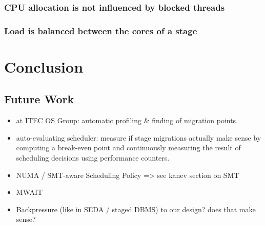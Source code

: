 \documentclass[12pt,a4paper]{book}
\begin{document}
\subsection{CPU allocation is not influenced by blocked threads}
\subsection{Load is balanced between the cores of a stage}

%


\chapter{Conclusion}\label{ch:concl}
\blindtext
\section{Future Work}
\begin{itemize}
    \item at ITEC OS Group: automatic profiling \& finding of migration points.
    \item auto-evaluating scheduler: measure if stage migrations actually make sense by computing a break-even point and continuously measuring the result of scheduling decisions using performance counters.
    \item NUMA / SMT-aware Scheduling Policy => see kanev section on SMT
    \item MWAIT
    \item Backpressure (like in SEDA / staged DBMS) to our design? does that make sense?
\end{itemize}
\end{document}
